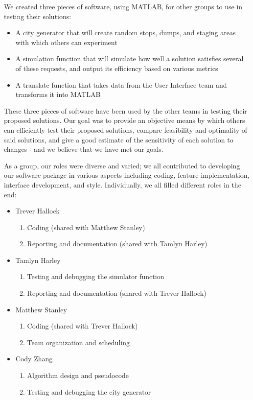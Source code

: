 \documentclass{article}
\begin{document}
We created three pieces of software, using MATLAB, for other groups to use in testing their solutions:

\begin{itemize}
\item A city generator that will create random stops, dumps, and staging areas with which others can experiment
\item A simulation function that will simulate how well a solution satisfies several of these requests, and output its efficiency based on various metrics
\item A translate function that takes data from the User Interface team and transforms it into MATLAB
\end{itemize}

These three pieces of software have been used by the other teams in testing their proposed solutions.  Our goal was to provide an objective means by which others can efficiently test their proposed solutions, compare feasibility and optimality of said solutions, and give a good estimate of the sensitivity of each solution to changes - and we believe that we have met our goals.

As a group, our roles were diverse and varied; we all contributed to developing our software package in various aspects including coding, feature implementation, interface development, and style.  Individually, we all filled different roles in the end:

\begin{itemize}
	\item Trever Hallock
	\begin{enumerate}
		\item Coding (shared with Matthew Stanley)
		\item Reporting and documentation (shared with Tamlyn Harley)
	\end{enumerate}
	\item Tamlyn Harley
	\begin{enumerate}
		\item Testing and debugging the simulator function
		\item Reporting and documentation (shared with Trever Hallock)
	\end{enumerate}
	\item Matthew Stanley
	\begin{enumerate}
		\item Coding (shared with Trever Hallock)
		\item Team organization and scheduling
	\end{enumerate}
	\item Cody Zhang
	\begin{enumerate}
		\item Algorithm design and pseudocode
		\item Testing and debugging the city generator
	\end{enumerate}
\end{itemize}
\end{document}
